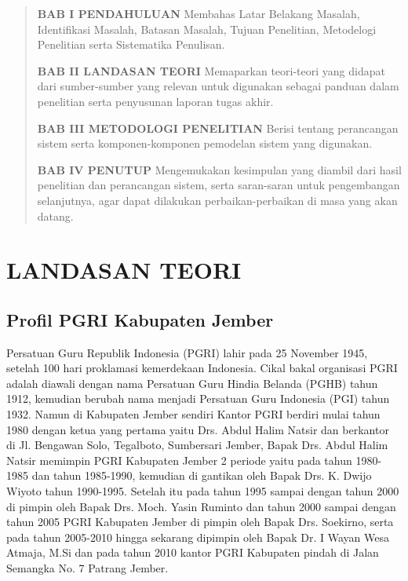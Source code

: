 \documentclass{jtetiproposalskripsi}
\begin{document}
\begin{quote}
\textbf {BAB I PENDAHULUAN}
Membahas Latar Belakang Masalah, Identifikasi Masalah, Batasan Masalah, Tujuan Penelitian, Metodelogi Penelitian serta Sistematika Penulisan.

\textbf {BAB II LANDASAN TEORI}
Memaparkan teori-teori yang didapat dari sumber-sumber yang relevan untuk digunakan sebagai panduan dalam penelitian serta penyusunan laporan tugas akhir.

\textbf {BAB III METODOLOGI PENELITIAN}
Berisi tentang perancangan sistem serta komponen-komponen pemodelan sistem yang digunakan.

\textbf {BAB IV PENUTUP}
Mengemukakan kesimpulan yang diambil dari hasil penelitian dan perancangan sistem, serta saran-saran untuk pengembangan selanjutnya, agar dapat dilakukan perbaikan-perbaikan di masa yang akan datang.

\end{quote}

\chapter{LANDASAN TEORI}                

\section{Profil PGRI Kabupaten Jember}
Persatuan Guru Republik Indonesia (PGRI)  lahir pada 25 November 1945, setelah 100 hari proklamasi kemerdekaan Indonesia. Cikal bakal organisasi PGRI adalah diawali dengan nama Persatuan Guru Hindia Belanda (PGHB) tahun 1912, kemudian berubah nama menjadi Persatuan Guru Indonesia (PGI) tahun 1932. Namun di Kabupaten Jember sendiri Kantor PGRI berdiri mulai tahun 1980 dengan ketua yang pertama yaitu Drs. Abdul Halim Natsir dan berkantor di Jl. Bengawan Solo, Tegalboto, Sumbersari Jember, Bapak Drs. Abdul Halim Natsir memimpin PGRI Kabupaten Jember 2 periode yaitu pada tahun 1980-1985 dan tahun 1985-1990, kemudian di gantikan oleh Bapak Drs. K. Dwijo Wiyoto tahun 1990-1995. 
Setelah itu pada tahun 1995 sampai dengan tahun 2000 di pimpin oleh Bapak Drs. Moch. Yasin Ruminto dan tahun 2000 sampai dengan tahun 2005 PGRI Kabupaten Jember di pimpin oleh Bapak Drs. Soekirno, serta pada tahun 2005-2010  hingga sekarang dipimpin oleh Bapak Dr. I Wayan Wesa Atmaja, M.Si dan pada tahun 2010 kantor PGRI Kabupaten pindah di Jalan Semangka No. 7 Patrang Jember.
\end{document}

